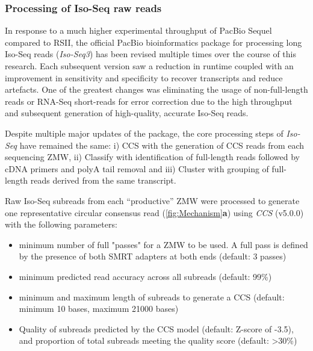 \subsubsection{Processing of Iso-Seq raw reads}
\label{section: Isoseq_rawprocessing}
In response to a much higher experimental throughput of PacBio Sequel compared to RSII, the official PacBio bioinformatics package for processing long Iso-Seq reads (\textit{Iso-Seq3}) has been revised multiple times over the course of this research. Each subsequent version saw a reduction in runtime coupled with an improvement in sensitivity and specificity to recover transcripts and reduce artefacts. One of the greatest changes was eliminating the usage of non-full-length reads or RNA-Seq short-reads for error correction due to the high throughput and subsequent generation of high-quality, accurate Iso-Seq reads. 

Despite multiple major updates of the package, the core processing steps of \textit{Iso-Seq} have remained the same: i) CCS with the generation of CCS reads from each sequencing ZMW, ii) Classify with identification of full-length reads followed by cDNA primers and polyA tail removal and iii) Cluster with grouping of full-length reads derived from the same transcript. 

Raw Iso-Seq subreads from each “productive” ZMW were processed to generate one representative circular consensus read (\cref{fig:Mechanism}\textbf{a}) using \textit{CCS} (v5.0.0) with the following parameters: 
\begin{itemize}
	\item minimum number of full "passes" for a ZMW to be used. A full pass is defined by the presence of both SMRT adapters at both ends (default: 3 passes)
	\item minimum predicted read accuracy across all subreads (default: 99\%)
	\item minimum and maximum length of subreads to generate a CCS (default: minimum 10 bases, maximum 21000 bases)
	\item Quality of subreads predicted by the CCS model (default: Z-score of -3.5), and proportion of total subreads meeting the quality score (default: \textgreater 30\%)
\end{itemize}


